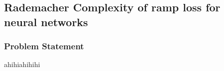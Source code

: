 \newpage
\subsection{Rademacher Complexity of ramp loss for neural networks}
\subsubsection{Problem Statement}
ahihiahihihi